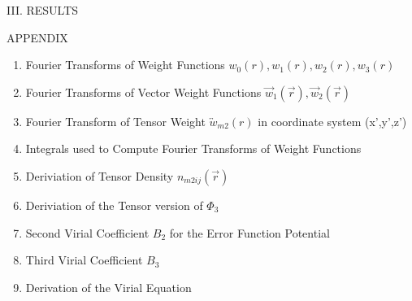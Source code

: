 \documentclass[12pt]{article}
\begin{document}
\[{}\]
\[{}\]
\[{}\]
\[{}\]
\[{}\]
\[{}\]
III. RESULTS
\[{}\]
\[{}\]
\[{}\]
\[{}\]
\[{}\]
\[{}\]
\[{}\]
\[{}\]



APPENDIX
\begin{enumerate}

\item Fourier Transforms of Weight Functions $w_0(r), w_1(r), w_2(r), w_3(r)$
\item Fourier Transforms of Vector Weight Functions $\vec{w}_1(\vec{r}), \vec{w}_2(\vec{r})$  
\item Fourier Transform of Tensor Weight $\overleftrightarrow{w}_{m2}(r)$ in coordinate system (x',y',z')
\item Integrals used to Compute Fourier Transforms of Weight Functions
\item Deriviation of Tensor Density $n_{m2ij}(\vec{r})$ 
\item Deriviation of the Tensor version of $\Phi_3$ 
\item Second Virial Coefficient $B_{2}$ for the Error Function Potential 
\item Third Virial Coefficient $B_{3}$
\item Derivation of the Virial Equation
\end{enumerate}
\end{document}
